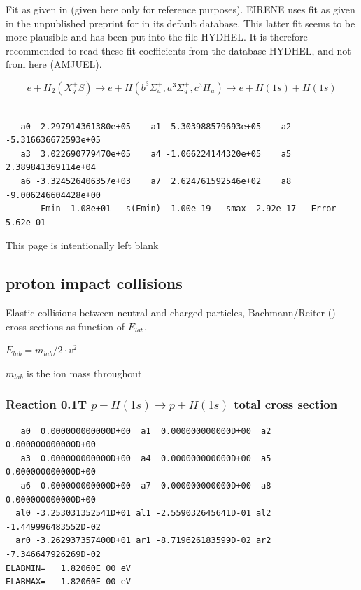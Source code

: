 \documentclass[12pt,dvips]{article}
\begin{document}
Fit as given in \cite{kn:Janev} (given here only for reference purposes).
EIRENE uses fit as given in the unpublished preprint for
\cite{kn:Janev} in its default database.
This latter fit seems to be more plausible  and has been put
into the file HYDHEL.
It is therefore recommended to read these
fit coefficients from the database HYDHEL, and not from here (AMJUEL).





\begin{displaymath}
 e + H_2 (X_g^+ S ) \rightarrow e + H (b^3\Sigma^+_u , a^3\Sigma^+_g,
c^3\Pi_u)
             \rightarrow e + H(1s) + H(1s)
\end{displaymath}


\begin{small}\begin{verbatim}

   a0 -2.297914361380e+05    a1  5.303988579693e+05    a2 -5.316636672593e+05
   a3  3.022690779470e+05    a4 -1.066224144320e+05    a5  2.389841369114e+04
   a6 -3.324526406357e+03    a7  2.624761592546e+02    a8 -9.006246604428e+00
       Emin  1.08e+01   s(Emin)  1.00e-19   smax  2.92e-17   Error  5.62e-01
\end{verbatim}\end{small}
\newpage
This page is intentionally left blank
\newpage


\subsection{proton impact collisions}\label{sect1.1}
\bigskip
Elastic collisions between neutral and charged particles,
Bachmann/Reiter (\cite{kn:Bachmann})
cross-sections as function of $E_{lab}$,

$E_{lab} = m_{lab}/2 \cdot v^2$

$m_{lab}$ is the ion mass throughout

\subsubsection{
Reaction 0.1T $p + H (1s) \rightarrow p + H (1s) $ total cross
section}

\begin{small}\begin{verbatim}
   a0  0.000000000000D+00  a1  0.000000000000D+00  a2  0.000000000000D+00
   a3  0.000000000000D+00  a4  0.000000000000D+00  a5  0.000000000000D+00
   a6  0.000000000000D+00  a7  0.000000000000D+00  a8  0.000000000000D+00
  al0 -3.253031352541D+01 al1 -2.559032645641D-01 al2 -1.449996483552D-02
  ar0 -3.262937357400D+01 ar1 -8.719626183599D-02 ar2 -7.346647926269D-02
ELABMIN=   1.82060E 00 eV
ELABMAX=   1.82060E 00 eV
\end{verbatim}\end{small}
\end{document}
